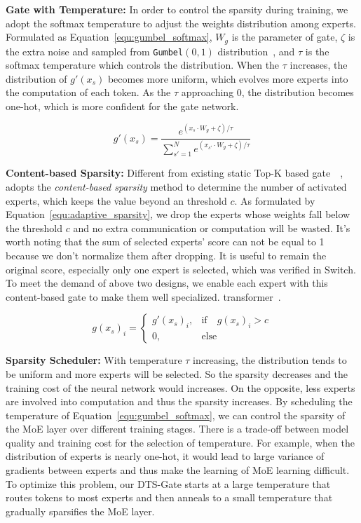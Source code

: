 \textbf{Gate with Temperature:}
In order to control the sparsity during training, we adopt the softmax temperature to adjust the weights distribution among experts. Formulated as Equation~\ref{equ:gumbel_softmax}, $W_{g}$ is the parameter of gate, $\zeta$ is the extra noise and sampled from \texttt{Gumbel}$(0, 1)$ distribution~\citep{DBLP:gumbel_softmax}, and $\tau$ is the softmax temperature which controls the distribution. 
When the $\tau$ increases, the distribution of $g'(x_{s})$ becomes more uniform, which evolves more experts into the computation of each token.
As the $\tau$ approaching 0, the distribution becomes one-hot, which is more confident for the gate network.

\begin{equation}
g'(x_{s})  =  \frac {e^{(x_{s} \cdot W_{g}+\zeta)/\tau }}{\sum _ {s'=1}^ {N}e^{(x_{s'} \cdot W_{g}+\zeta)/\tau }}
\label{equ:gumbel_softmax}
\end{equation}

\textbf{Content-based Sparsity:}
Different from existing static Top-K based gate~\cite{DBLP:switch}~\cite{DBLP:gshard}, \ourmethods{} adopts the \textit{content-based sparsity} method to determine the number of activated experts, which keeps the value beyond an threshold $c$. As formulated by Equation~\ref{equ:adaptive_sparsity}, we drop the experts whose weights fall below the threshold $c$ and no extra communication or computation will be wasted. 
It's worth noting that the sum of selected experts' score can not be equal to 1 because we don't normalize them after dropping. It is useful to remain the original score, especially only one expert is selected, which was verified in Switch. To meet the demand of above two designs, we enable each expert with this content-based gate to make them well specialized. transformer~\cite{DBLP:switch}.

\begin{equation}
g(x_{s})_i = \begin{cases}
  g'(x_{s})_i, &\text{if}\quad {g(x_{s})_i} > c \\
  0, &\text{else}
\end{cases}
\label{equ:adaptive_sparsity}
\end{equation}

\textbf{Sparsity Scheduler:} 
With temperature $\tau$ increasing, the distribution tends to be uniform and more experts will be selected. So the sparsity decreases and the training cost of the neural network would increases.
On the opposite, less experts are involved into computation and thus the sparsity increases.
By scheduling the temperature of Equation~\ref{equ:gumbel_softmax}, we can control the sparsity of the MoE layer over different training stages. There is a trade-off between model quality and training cost for the selection of temperature. 
For example, when the distribution of experts is nearly one-hot, it would lead to large variance of gradients between experts and thus make the learning of MoE learning difficult. To optimize this problem, our DTS-Gate starts at a large temperature that routes tokens to most experts and then anneals to a small temperature that gradually sparsifies the MoE layer. 

